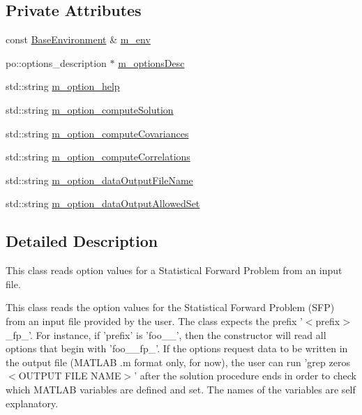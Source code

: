 \subsection*{Private Attributes}
\begin{DoxyCompactItemize}
\item 
const \hyperlink{class_q_u_e_s_o_1_1_base_environment}{Base\-Environment} \& \hyperlink{class_q_u_e_s_o_1_1_statistical_forward_problem_options_a14f437399d668fac2aac5861bd6f39ca}{m\-\_\-env}
\item 
po\-::options\-\_\-description $\ast$ \hyperlink{class_q_u_e_s_o_1_1_statistical_forward_problem_options_a8e7a0bd5657edc636cddd2f377d09501}{m\-\_\-options\-Desc}
\item 
std\-::string \hyperlink{class_q_u_e_s_o_1_1_statistical_forward_problem_options_a6a48a27ad2c386feb7807e0623573fc5}{m\-\_\-option\-\_\-help}
\item 
std\-::string \hyperlink{class_q_u_e_s_o_1_1_statistical_forward_problem_options_a5e7c8a8383bb80a98ab4c271748e0d00}{m\-\_\-option\-\_\-compute\-Solution}
\item 
std\-::string \hyperlink{class_q_u_e_s_o_1_1_statistical_forward_problem_options_ad3f809f0695c126956afd86e07f77bc4}{m\-\_\-option\-\_\-compute\-Covariances}
\item 
std\-::string \hyperlink{class_q_u_e_s_o_1_1_statistical_forward_problem_options_ad712823b5b7b3ce5c76a793a531f0f80}{m\-\_\-option\-\_\-compute\-Correlations}
\item 
std\-::string \hyperlink{class_q_u_e_s_o_1_1_statistical_forward_problem_options_ad4f884177efb0d4ab7068dfe00861f9c}{m\-\_\-option\-\_\-data\-Output\-File\-Name}
\item 
std\-::string \hyperlink{class_q_u_e_s_o_1_1_statistical_forward_problem_options_a8f7d13eaec063727f412add0a1a4d9af}{m\-\_\-option\-\_\-data\-Output\-Allowed\-Set}
\end{DoxyCompactItemize}


\subsection{Detailed Description}
This class reads option values for a Statistical Forward Problem from an input file. 

This class reads the option values for the Statistical Forward Problem (S\-F\-P) from an input file provided by the user. The class expects the prefix '$<$prefix$>$\-\_\-fp\-\_\-'. For instance, if 'prefix' is 'foo\-\_\-\_\-', then the constructor will read all options that begin with 'foo\-\_\-\_\-fp\-\_\-'. If the options request data to be written in the output file (M\-A\-T\-L\-A\-B .m format only, for now), the user can run 'grep zeros $<$O\-U\-T\-P\-U\-T F\-I\-L\-E N\-A\-M\-E$>$' after the solution procedure ends in order to check which M\-A\-T\-L\-A\-B variables are defined and set. The names of the variables are self explanatory. 

